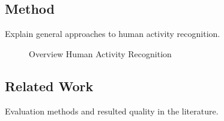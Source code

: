 
\subsection{Method}

Explain general approaches to human activity recognition.

\begin{figure}[htbp]
\centering
{}
\caption{Overview Human Activity Recognition}
\end{figure}

\subsection{Related Work}
Evaluation methods and resulted quality in the literature.

